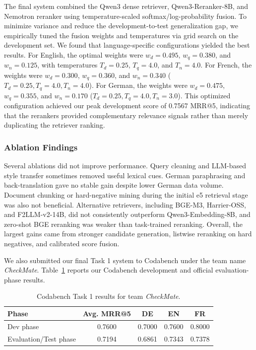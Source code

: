 \documentclass[
]{ceurart}
\begin{document}
The final system combined the Qwen3 dense retriever, Qwen3-Reranker-8B, and Nemotron reranker using temperature-scaled softmax/log-probability fusion. To minimize variance and reduce the development-to-test generalization gap, we empirically tuned the fusion weights and temperatures via grid search on the development set. We found that language-specific configurations yielded the best results. For English, the optimal weights were $w_d=0.495$, $w_q=0.380$, and $w_n=0.125$, with temperatures $T_d=0.25$, $T_q=4.0$, and $T_n=4.0$. For French, the weights were $w_d=0.300$, $w_q=0.360$, and $w_n=0.340$ ($T_d=0.25, T_q=4.0, T_n=4.0$). For German, the weights were $w_d=0.475$, $w_q=0.355$, and $w_n=0.170$ ($T_d=0.25, T_q=4.0, T_n=3.0$). This optimized configuration achieved our peak development score of 0.7567 MRR@5, indicating that the rerankers provided complementary relevance signals rather than merely duplicating the retriever ranking.

\subsubsection{Ablation Findings}

Several ablations did not improve performance. Query cleaning and LLM-based style transfer sometimes removed useful lexical cues. German paraphrasing and back-translation gave no stable gain despite lower German data volume. Document chunking or hard-negative mining during the initial e5 retrieval stage was also not beneficial. Alternative retrievers, including BGE-M3, Harrier-OSS, and F2LLM-v2-14B, did not consistently outperform Qwen3-Embedding-8B, and zero-shot BGE reranking was weaker than task-trained reranking. Overall, the largest gains came from stronger candidate generation, listwise reranking on hard negatives, and calibrated score fusion.

We also submitted our final Task 1 system to Codabench under the team name \textit{CheckMate}. Table~\ref{tab:task1_codabench} reports our Codabench development and official evaluation-phase results.

\begin{table}[h]
  \caption{Codabench Task 1 results for team \textit{CheckMate}.}
  \label{tab:task1_codabench}
  \centering
  \begin{tabular}{lcccc}
    \toprule
    Phase & Avg. MRR@5 & DE & EN & FR \\
    \midrule
    Dev phase & 0.7600 & 0.7000 & 0.7600 & 0.8000 \\
    Evaluation/Test phase & 0.7194 & 0.6861 & 0.7343 & 0.7378 \\
    \bottomrule
  \end{tabular}
\end{table}
\end{document}
